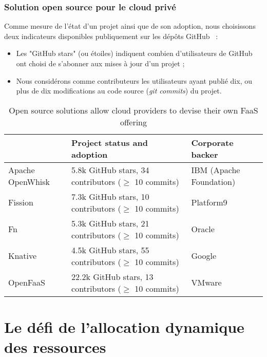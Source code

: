 \subsubsection{Solution open source pour le cloud privé}

Comme mesure de l'état d'un projet ainsi que de son adoption, nous choisissons deux indicateurs disponibles publiquement sur les dépôts GitHub~\cite{github} :

\begin{itemize}
    \item Les "GitHub stars" (ou étoiles) indiquent combien d'utilisateurs de GitHub ont choisi de s'abonner aux mises à jour d'un projet ;
    \item Nous considérons comme contributeurs les utilisateurs ayant publié dix, ou plus de dix modifications au code source (\textit{git commits}) du projet.
\end{itemize}

\begin{table}[H]
\caption{Open source solutions allow cloud providers to devise their own FaaS offering}
\centering
\begin{tabularx}{\textwidth} { 
  | >{\centering\arraybackslash}X 
  | >{\centering\arraybackslash}X 
  | >{\centering\arraybackslash}X  | }
\hline
                       & \textbf{Project status and adoption} & \textbf{Corporate backer} \\ \hline
Apache OpenWhisk       & 5.8k GitHub stars, 34 contributors ($\geq$ 10 commits) & IBM (Apache Foundation)             \\ \hline
Fission                & 7.3k GitHub stars, 10 contributors ($\geq$ 10 commits) & Platform9             \\ \hline
Fn                     & 5.3k GitHub stars, 21 contributors ($\geq$ 10 commits) & Oracle             \\ \hline
Knative                & 4.5k GitHub stars, 55 contributors ($\geq$ 10 commits) & Google             \\ \hline
OpenFaaS               & 22.2k GitHub stars, 13 contributors ($\geq$ 10 commits) & VMware             \\ \hline
\end{tabularx}
\label{table:foss-faas}
\end{table}

\section{Le défi de l'allocation dynamique des ressources}

